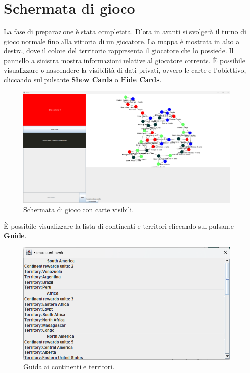 \documentclass[a4paper,12pt]{report}
\begin{document}
\section{Schermata di gioco}
La fase di preparazione è stata completata. D'ora in avanti si svolgerà il turno di gioco normale fino alla vittoria di un giocatore.
La mappa è mostrata in alto a destra, dove il colore del territorio rappresenta il giocatore che lo possiede.
Il pannello a sinistra mostra informazioni relative al giocatore corrente.
È possibile visualizzare o nascondere la visibilità di dati privati, ovvero le carte e l'obiettivo, cliccando sul pulsante \textbf{Show Cards} o \textbf{Hide Cards}.
\begin{figure}[H]
	\centering
	\includegraphics[width=1\textwidth]{user_guide/5_game_screen_show.png}
	\caption{Schermata di gioco con carte visibili.}
\end{figure}
È possibile visualizzare la lista di continenti e territori cliccando sul pulsante \textbf{Guide}.
\begin{figure}[H]
	\centering
	\includegraphics[width=1\textwidth]{user_guide/6_continent_list.png}
	\caption{Guida ai continenti e territori.}
\end{figure}
\end{document}
